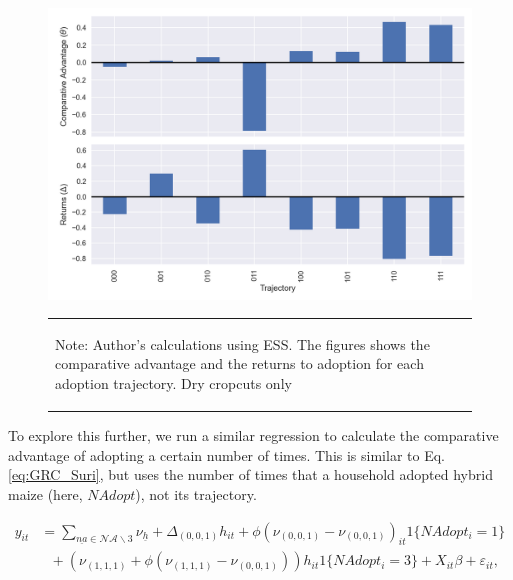 \documentclass[11pt]{article}
\begin{document}
\begin{figure}
    \centering
    \caption{Comparative Advantage and Returns by Trajectory (Dry Cropcuts)}
    \includegraphics[scale=0.7]{results/figures/theta.png}\label{fig:theta_delta_raw}
        \vspace*{-2em}
    \begin{table}[H]
        \centering
        \begin{tabular}{p{}} 
            \begin{tablenotes}
                  \small
                  \item Note: Author's calculations using ESS. The figures shows the comparative advantage and the returns to adoption for each adoption trajectory. Dry cropcuts only
            \end{tablenotes}
        \end{tabular}
    \end{table}
\end{figure}

To explore this further, we run a similar regression to calculate the comparative advantage of adopting a certain number of times. This is similar to Eq. \ref{eq:GRC_Suri}, but uses the number of times that a household adopted hybrid maize (here, $NAdopt$), not its trajectory.

\begin{align}
y_{it}&=\sum_{\underline{na}\in\mathcal{NA}\backslash 3}\nu_{\underline{h}}+\Delta_{(0,0,1)}h_{it}+\phi(\nu_{(0,0,1)}-\nu_{(0,0,1)})_{it}1\{NAdopt_{i}=1\}\nonumber\\
&~~~+\left(\nu_{(1,1,1)}+\phi\left(\nu_{(1,1,1)}-\nu_{(0,0,1)}\right)\right)h_{it}1\{NAdopt_{i}=3\} + X_{it}\beta +\varepsilon_{it},\label{eq:GRC_NAdopt}
\end{align}
\end{document}
